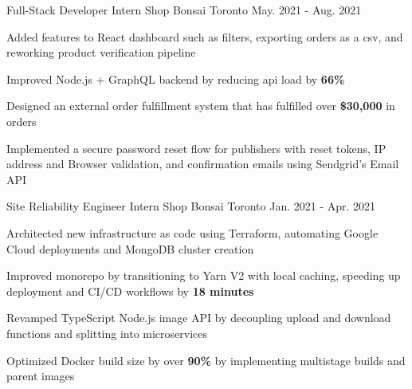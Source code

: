 

\begin{cventries}

  \cventry
    {Full-Stack Developer Intern} %
    {Shop Bonsai} %
    {Toronto} %
    {May. 2021 - Aug. 2021} %
    {
      \begin{cvitems} %
        \item {Added features to React dashboard such as filters, exporting orders as a csv, and reworking product verification pipeline}
        \item {Improved Node.js + GraphQL backend by reducing api load by \textbf{66\%}}
        \item {Designed an external order fulfillment system that has fulfilled over \textbf{\$30,000} in orders}
        \item {Implemented a secure password reset flow for publishers with reset tokens, IP address and Browser validation, and confirmation emails using Sendgrid's Email API}
      \end{cvitems}
    }
    
  \cventry
    {Site Reliability Engineer Intern} %
    {Shop Bonsai} %
    {Toronto} %
    {Jan. 2021 - Apr. 2021} %
    {
      \begin{cvitems} %
        \item {Architected new infrastructure as code using Terraform, automating Google Cloud deployments and MongoDB cluster creation}
        \item {Improved monorepo by transitioning to Yarn V2 with local caching, speeding up deployment and CI/CD workflows by \textbf{18 minutes}}
        \item {Revamped TypeScript Node.js image API by decoupling upload and download functions and splitting into microservices}
        \item {Optimized Docker build size by over \textbf{90\%} by implementing multistage builds and parent images}
      \end{cvitems}
    }
    
\end{cventries}
